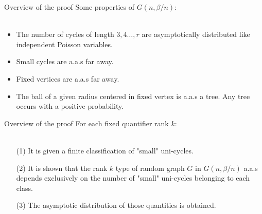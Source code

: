 \documentclass[handout, 11pt]{beamer}
\begin{document}
	\begin{frame}{Overview of the proof}
	Some properties of $G(n,\beta/n)$:
	\\~\\
	\begin{itemize}
		\item The number of cycles of 
		length $3,4\dots, r$
		are asymptotically distributed like independent Poisson 
		variables.
		\item Small cycles are a.a.s far away.
		\item Fixed vertices are a.a.s far away.
		\item The ball of a given radius centered in fixed
		vertex is a.a.s a tree. Any tree occurs with a positive 
		probability.
	\end{itemize}
	
	\end{frame}

	\begin{frame}{Overview of the proof}
	For each fixed quantifier rank $k$:
	\\~\\
		\begin{itemize}
			\item[(1)]	It is given a finite classification of "small" uni-cycles.
			\item[(2)]  It is shown that the rank $k$ type of random graph $G$
			 in $G(n,\beta/n)$ a.a.s depends exclusively on the number of "small" uni-cycles
			 belonging to each class. 
			\item[(3)] The asymptotic distribution of those quantities is obtained. 
		\end{itemize}
		
	\end{frame}
\end{document}
